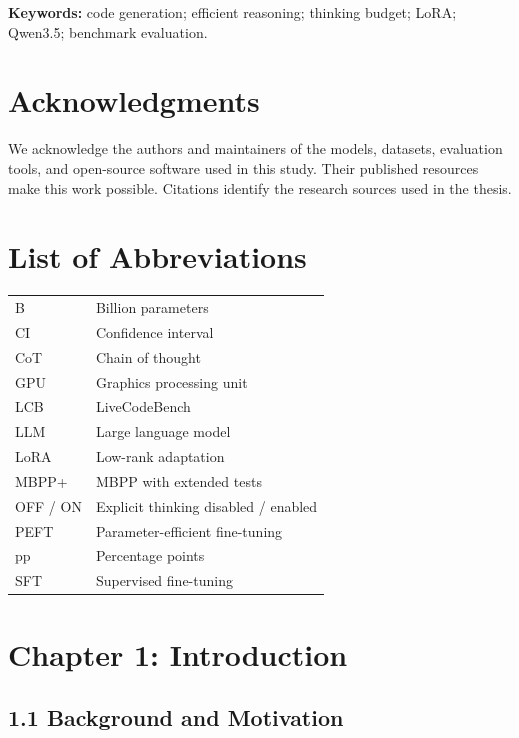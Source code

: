 \documentclass[11pt,letterpaper]{article}
\begin{document}
\par\bigskip\textbf{Keywords:} code generation; efficient reasoning; thinking budget; LoRA; Qwen3.5; benchmark evaluation.
\clearpage\section*{Acknowledgments}
We acknowledge the authors and maintainers of the models, datasets, evaluation tools, and open-source software used in this study. Their published resources make this work possible. Citations identify the research sources used in the thesis.
\par [PERSONAL ACKNOWLEDGMENTS: add verified names and any funding details before submission.]
\clearpage\tableofcontents
\clearpage\listoffigures
\clearpage\listoftables
\clearpage\section*{List of Abbreviations}
\begin{tabular}{ll}B & Billion parameters\\ CI & Confidence interval\\ CoT & Chain of thought\\ GPU & Graphics processing unit\\ LCB & LiveCodeBench\\ LLM & Large language model\\ LoRA & Low-rank adaptation\\ MBPP+ & MBPP with extended tests\\ OFF / ON & Explicit thinking disabled / enabled\\ PEFT & Parameter-efficient fine-tuning\\ pp & Percentage points\\ SFT & Supervised fine-tuning\end{tabular}
\clearpage{}


\section*{Chapter 1: Introduction}

\subsection*{1.1 Background and Motivation}
\end{document}

